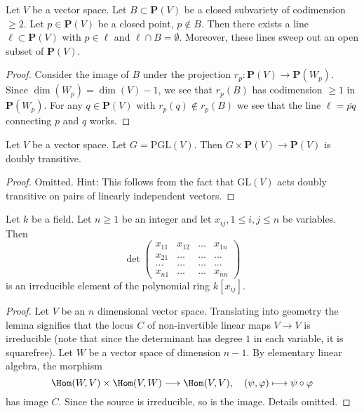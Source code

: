\begin{lemma}
\label{lemma-find-lines}
Let $V$ be a vector space. Let $B \subset \mathbf{P}(V)$
be a closed subvariety of codimension $\geq 2$.
Let $p \in \mathbf{P}(V)$ be a closed point, $p \not \in B$.
Then there exists a line $\ell \subset \mathbf{P}(V)$
with $p \in \ell$ and $\ell \cap B = \emptyset$. Moreover, these lines
sweep out an open subset of $\mathbf{P}(V)$.
\end{lemma}

\begin{proof}
Consider the image of $B$ under the projection
$r_p : \mathbf{P}(V) \to \mathbf{P}(W_p)$.
Since $\dim(W_p) = \dim(V) - 1$, we see that $r_p(B)$
has codimension $\geq 1$ in $\mathbf{P}(W_p)$.
For any $q \in \mathbf{P}(V)$ with $r_p(q) \not \in r_p(B)$
we see that the line $\ell = \overline{pq}$ connecting $p$ and $q$ works.
\end{proof}

\begin{lemma}
\label{lemma-doubly-transitive}
Let $V$ be a vector space. Let $G = \text{PGL}(V)$.
Then $G \times \mathbf{P}(V) \to \mathbf{P}(V)$ is
doubly transitive.
\end{lemma}

\begin{proof}
Omitted. Hint: This follows from the fact that $\text{GL}(V)$ acts doubly
transitive on pairs of linearly independent vectors.
\end{proof}

\begin{lemma}
\label{lemma-determinant}
Let $k$ be a field. Let $n \geq 1$ be an integer and let
$x_{ij}, 1 \leq i, j \leq n$ be variables. Then
$$
\det
\left(
\begin{matrix}
x_{11} & x_{12} & \ldots & x_{1n} \\
x_{21} & \ldots & \ldots & \ldots \\
\ldots & \ldots & \ldots & \ldots \\
x_{n1} & \ldots & \ldots & x_{nn}
\end{matrix}
\right)
$$
is an irreducible element of the polynomial ring $k[x_{ij}]$.
\end{lemma}

\begin{proof}
Let $V$ be an $n$ dimensional vector space. Translating into geometry
the lemma signifies that the locus $C$ of non-invertible linear maps
$V \to V$ is irreducible (note that since the determinant has degree
$1$ in each variable, it is squarefree). Let $W$ be a vector space of
dimension $n - 1$. By elementary linear algebra, the morphism
$$
\Hom(W, V) \times \Hom(V, W) \longrightarrow \Hom(V, V),\quad
(\psi, \varphi) \longmapsto \psi \circ \varphi
$$
has image $C$. Since the source is irreducible, so is the image.
Details omitted.
\end{proof}

